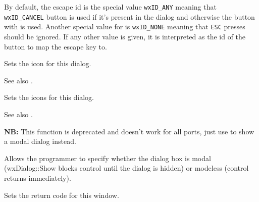 By default, the escape id is the special value \texttt{wxID\_ANY} meaning that 
\texttt{wxID\_CANCEL} button is used if it's present in the dialog and
otherwise the button with  
is used. Another special value for  is \texttt{wxID\_NONE} meaning that
\texttt{\textsc{ESC}} presses should be ignored. If any other value is given, it
is interpreted as the id of the button to map the escape key to.


\label{wxdialogseticon}


Sets the icon for this dialog.



See also .


\label{wxdialogseticons}


Sets the icons for this dialog.



See also .


\label{wxdialogsetmodal}


{\bf NB:} This function is deprecated and doesn't work for all ports, just use
 to show a modal dialog instead.

Allows the programmer to specify whether the dialog box is modal (wxDialog::Show blocks control
until the dialog is hidden) or modeless (control returns immediately).




\label{wxdialogsetreturncode}


Sets the return code for this window.



